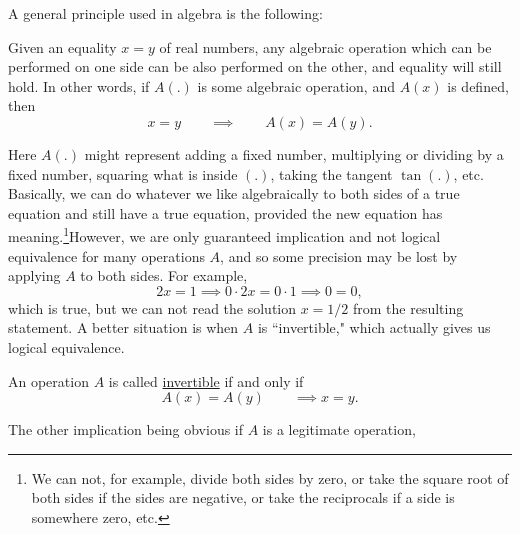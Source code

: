 A general principle used in algebra is the following:

\begin{principle}
Given an equality  $x=y$ of real numbers,
any algebraic operation which can be performed on one side
can be also performed on the other, and equality will still hold.
In other words, if $A(.)$ is some algebraic operation,
and $A(x)$ is defined, then
$$x=y \qquad\implies\qquad A(x)=A(y).$$
\end{principle}

Here $A(.)$ might represent adding a fixed number, multiplying or dividing
by a fixed number, squaring what is inside $(.)$, taking the
tangent $\tan(.)$, etc.  Basically, we can do whatever we like 
algebraically\footnotemark
{} 
to both sides of a true equation and still have a true equation, 
provided the new equation has meaning.\footnote{We can not, for example,
divide both sides by zero, or take the square root of
both sides if the sides are negative, or take the
reciprocals if a side is somewhere zero, etc.}\hphantom{. }However, 
we are only
guaranteed implication and not logical equivalence for many
operations $A$, and so 
some precision may be lost by applying $A$ to both sides.  
For example,
$$2x=1 \implies 0\cdot2x=0\cdot 1\implies 0=0,$$
which is true, but we can not read the solution $x=1/2$ from the
resulting statement.  A better situation is when $A$ is ``invertible," 
which actually gives
us logical equivalence.  
\begin{definition}An operation $A$ is called \underline{invertible} 
if and only if
\begin{equation}A(x)=A(y)\qquad\implies x=y.\end{equation}
\end{definition} 
The other implication being obvious if $A$ is a legitimate operation,
